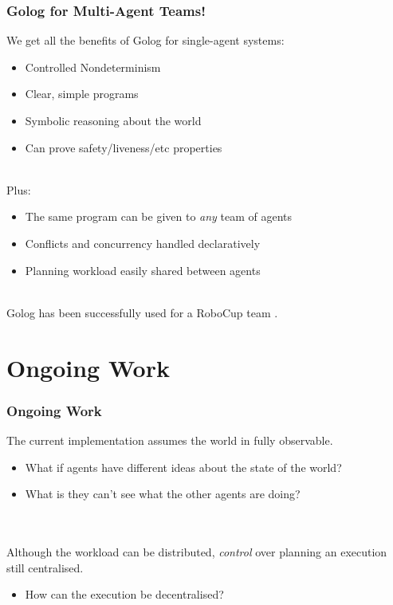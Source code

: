\documentclass{beamer}
\begin{document}
\begin{frame}
\frametitle{Golog for Multi-Agent Teams!}
We get all the benefits of Golog for single-agent systems:
\begin{itemize}
  \item Controlled Nondeterminism
  \item Clear, simple programs
  \item Symbolic reasoning about the world
  \item Can prove safety/liveness/etc properties
\end{itemize}
\ \\
Plus:
\begin{itemize}
  \item The same program can be given to \emph{any} team of agents
  \item Conflicts and concurrency handled declaratively
  \item Planning workload easily shared between agents
\end{itemize}
\ \\
Golog has been successfully used for a RoboCup team \cite{Ferrein2005readylog}.
\end{frame}


\section{Ongoing Work}

\begin{frame}
\frametitle{Ongoing Work}

The current implementation assumes the world in fully observable.
\begin{itemize}
  \item What if agents have different ideas about the state of the world?
  \item What is they can't see what the other agents are doing?
\end{itemize}
\ \\
\ \\
Although the workload can be distributed, \emph{control} over planning 
an execution still centralised.

\begin{itemize}
  \item How can the execution be decentralised?
\end{itemize}
\end{frame}
\end{document}
